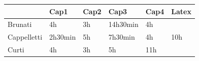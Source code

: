 \documentclass{article}
\begin{document}
    \begin{longtable}{|p{3cm}|p{2cm}|p{2cm}|p{2cm}|p{2cm}|p{2cm}|}
        \hline
                        & Cap1      & Cap2  & Cap3      & Cap4  & Latex \\
        \hline
            Brunati     & 4h        & 3h    & 14h30min  & 4h    &       \\
        \hline
            Cappelletti & 2h30min   & 5h    & 7h30min   & 4h    & 10h   \\
        \hline 
            Curti       & 4h        & 3h    & 5h        & 11h   &       \\
        \hline    
    \end{longtable}
\end{document}
